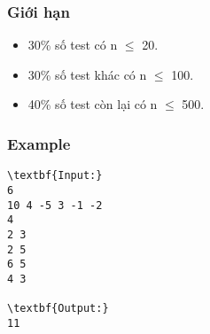 \subsubsection{Giới hạn}
\begin{itemize}
	\item 30\% số test có n  $\le$  20.
	\item 30\% số test khác có n  $\le$  100.
	\item 40\% số test còn lại có n  $\le$  500.
\end{itemize}

\subsubsection{Example}
\begin{verbatim}
\textbf{Input:}
6
10 4 -5 3 -1 -2
4
2 3
2 5
6 5
4 3

\textbf{Output:}
11
\end{verbatim}
